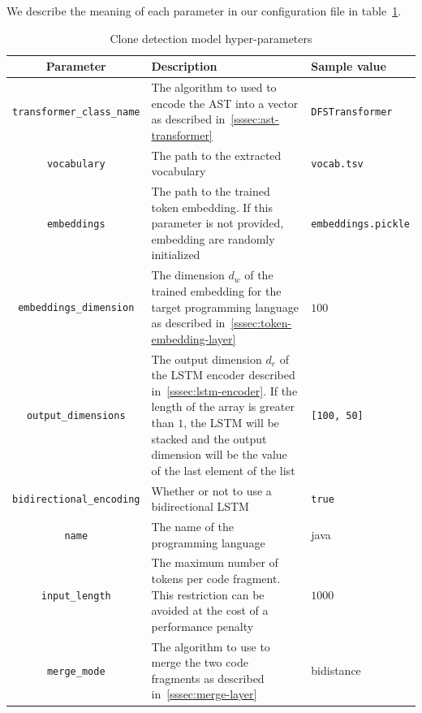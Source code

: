 \begin{figure}
  
\end{figure}

We describe the meaning of each parameter in our configuration file in
table~\ref{tab:hyper-parameters}.

\begin{table}
  \caption{\label{tab:hyper-parameters}Clone detection model hyper-parameters}
  \begin{center}
    \begin{tabularx}{\linewidth}{c X l}
      \toprule
      Parameter & Description & Sample value\\
      \toprule
      \lstinline{transformer_class_name} & The algorithm to used to encode
      the AST into a vector as described in~\ref{sssec:ast-transformer} & \lstinline{DFSTransformer}\\
      \lstinline{vocabulary} & The path to the extracted vocabulary & \lstinline{vocab.tsv}\\
      \lstinline{embeddings} & The path to the trained token embedding. If
      this parameter is not provided, embedding are randomly initialized & \lstinline{embeddings.pickle}\\
      \lstinline{embeddings_dimension} & The dimension $d_w$ of the trained
      embedding for the target programming language as described
      in~\ref{sssec:token-embedding-layer} & $100$\\
      \lstinline{output_dimensions} & The output dimension $d_e$ of the
      LSTM encoder described in~\ref{sssec:lstm-encoder}. If the length of the array
      is greater than $1$, the LSTM will be stacked and the output dimension will be
      the value of the last element of the list & \lstinline{[100, 50]}\\
      \lstinline{bidirectional_encoding} & Whether or not to use a
      bidirectional LSTM & \lstinline{true}\\
      \lstinline{name} & The name of the programming language & java\\
      \lstinline{input_length} & The maximum number of tokens per code
      fragment. This restriction can be avoided at the cost of a performance
      penalty & $1000$\\
      \lstinline{merge_mode} & The algorithm to use to merge the two code
      fragments as described in~\ref{sssec:merge-layer} & bidistance\\

\end{tabularx}
\end{center}
\end{table}
